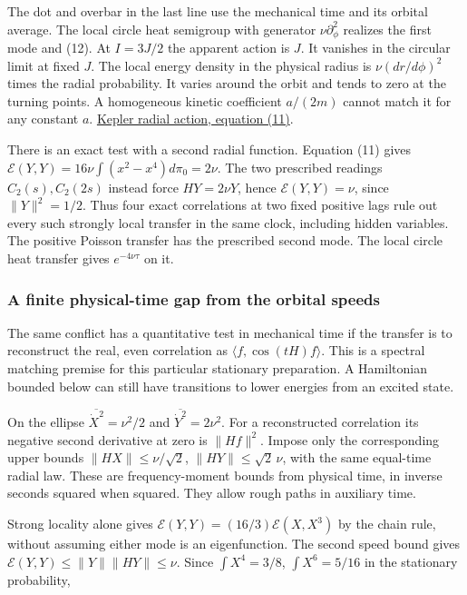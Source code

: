 \documentclass[11pt,a4paper]{article}
\begin{document}
The dot and overbar in the last line use the mechanical time and its
orbital average. The local circle heat semigroup with generator
\(\nu\partial_\phi^2\) realizes the first mode and (12). At \(I=3J/2\)
the apparent action is \(J\). It vanishes in the circular limit at fixed
\(J\). The local energy density in the physical radius is
\(\nu(dr/d\phi)^2\) times the radial probability. It varies around the
orbit and tends to zero at the turning points. A homogeneous kinetic
coefficient \(a/(2m)\) cannot match it for any constant \(a\).
\href{rivero-1998-conjecture-central-forces.md\#5-hooke-and-kepler-radial-actions-and-maslov-phases}{Kepler
radial action, equation (11)}.

There is an exact test with a second radial function. Equation (11)
gives \(\mathcal E(Y,Y)=16\nu\int(x^2-x^4)d\pi_0=2\nu\). The two
prescribed readings \(C_2(s),C_2(2s)\) instead force \(HY=2\nu Y\),
hence \(\mathcal E(Y,Y)=\nu\), since \(\|Y\|^2=1/2\). Thus four exact
correlations at two fixed positive lags rule out every such strongly
local transfer in the same clock, including hidden variables. The
positive Poisson transfer has the prescribed second mode. The local
circle heat transfer gives \(e^{-4\nu\tau}\) on it.

\subsubsection{A finite physical-time gap from the orbital
speeds}\label{a-finite-physical-time-gap-from-the-orbital-speeds}

The same conflict has a quantitative test in mechanical time if the
transfer is to reconstruct the real, even correlation as
\(\langle f,\cos(tH)f\rangle\). This is a spectral matching premise for
this particular stationary preparation. A Hamiltonian bounded below can
still have transitions to lower energies from an excited state.

On the ellipse \(\overline{\dot X^2}=\nu^2/2\) and
\(\overline{\dot Y^2}=2\nu^2\). For a reconstructed correlation its
negative second derivative at zero is \(\|Hf\|^2\). Impose only the
corresponding upper bounds \(\|HX\|\le\nu/\sqrt2\),
\(\|HY\|\le\sqrt2\,\nu\), with the same equal-time radial law. These are
frequency-moment bounds from physical time, in inverse seconds squared
when squared. They allow rough paths in auxiliary time.

Strong locality alone gives \(\mathcal E(Y,Y)=(16/3)\mathcal E(X,X^3)\)
by the chain rule, without assuming either mode is an eigenfunction. The
second speed bound gives \(\mathcal E(Y,Y)\le\|Y\|\|HY\|\le\nu\). Since
\(\int X^4=3/8\), \(\int X^6=5/16\) in the stationary probability,
\end{document}
